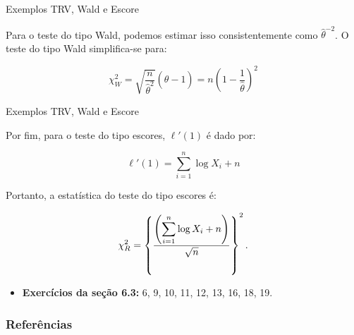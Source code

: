 \documentclass[12pt]{beamer}
\begin{document}
\begin{frame}{Exemplos TRV, Wald e Escore}
\begin{block}{}
\justifying
Para o teste do tipo Wald, podemos estimar isso consistentemente como \(\hat{\theta}^{-2}\). O teste do tipo Wald simplifica-se para:

\[\chi^2_W = \sqrt{\dfrac{n}{\hat{\theta}^{2}}}(\hat{\theta}-1)=n\left(1 - \frac{1}{\hat{\theta}}\right)^2\]
\end{block}
\end{frame}


\begin{frame}{Exemplos TRV, Wald e Escore}
\begin{block}{}
\justifying
Por fim, para o teste do tipo escores, \(\ell'(1)\) é dado por:

\[\ell'(1) = \sum_{i=1}^n \log X_i + n\]

Portanto, a estatística do teste do tipo escores é:

\[\chi^2_R = \left\{\dfrac{\left({\displaystyle \sum_{i=1}^{n}} \log X_i + n\right)}{\sqrt{n}}\right\}^{2}.\]
\end{block}
\end{frame}

\begin{frame}{\Home}
\begin{block}{}
\justifying
\begin{itemize}
    \item \textbf{Exercícios da seção 6.3:} 6, 9, 10, 11, 12, 13, 16, 18, 19.
\end{itemize}
\end{block}
\nocite{hogg}
\end{frame}

\begin{frame}[allowframebreaks]
\frametitle{\bf Referências}
\printbibliography
\end{frame}
\end{document}
